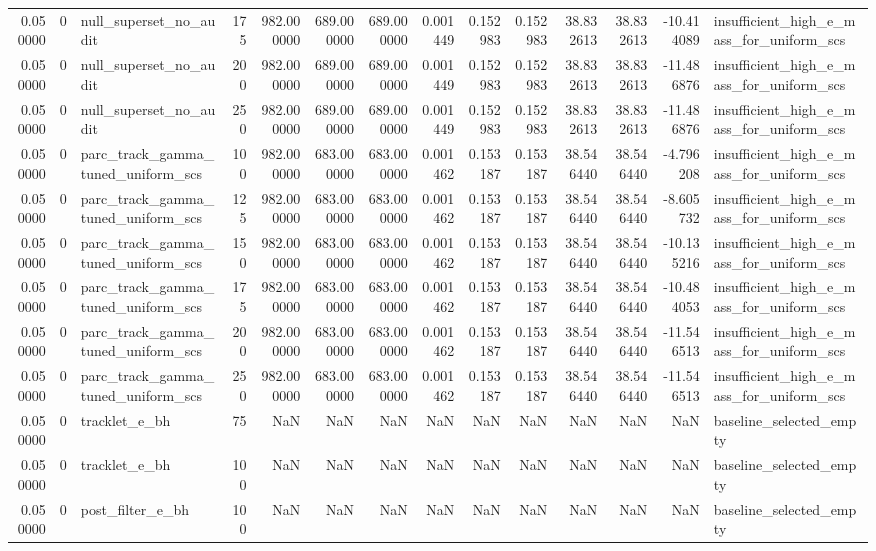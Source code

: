 \begin{tabular}{rrlrrrrrrrrrrl}
0.050000 & 0 & null_superset_no_audit & 175 & 982.000000 & 689.000000 & 689.000000 & 0.001449 & 0.152983 & 0.152983 & 38.832613 & 38.832613 & -10.414089 & insufficient_high_e_mass_for_uniform_scs \\
0.050000 & 0 & null_superset_no_audit & 200 & 982.000000 & 689.000000 & 689.000000 & 0.001449 & 0.152983 & 0.152983 & 38.832613 & 38.832613 & -11.486876 & insufficient_high_e_mass_for_uniform_scs \\
0.050000 & 0 & null_superset_no_audit & 250 & 982.000000 & 689.000000 & 689.000000 & 0.001449 & 0.152983 & 0.152983 & 38.832613 & 38.832613 & -11.486876 & insufficient_high_e_mass_for_uniform_scs \\
0.050000 & 0 & parc_track_gamma_tuned_uniform_scs & 100 & 982.000000 & 683.000000 & 683.000000 & 0.001462 & 0.153187 & 0.153187 & 38.546440 & 38.546440 & -4.796208 & insufficient_high_e_mass_for_uniform_scs \\
0.050000 & 0 & parc_track_gamma_tuned_uniform_scs & 125 & 982.000000 & 683.000000 & 683.000000 & 0.001462 & 0.153187 & 0.153187 & 38.546440 & 38.546440 & -8.605732 & insufficient_high_e_mass_for_uniform_scs \\
0.050000 & 0 & parc_track_gamma_tuned_uniform_scs & 150 & 982.000000 & 683.000000 & 683.000000 & 0.001462 & 0.153187 & 0.153187 & 38.546440 & 38.546440 & -10.135216 & insufficient_high_e_mass_for_uniform_scs \\
0.050000 & 0 & parc_track_gamma_tuned_uniform_scs & 175 & 982.000000 & 683.000000 & 683.000000 & 0.001462 & 0.153187 & 0.153187 & 38.546440 & 38.546440 & -10.484053 & insufficient_high_e_mass_for_uniform_scs \\
0.050000 & 0 & parc_track_gamma_tuned_uniform_scs & 200 & 982.000000 & 683.000000 & 683.000000 & 0.001462 & 0.153187 & 0.153187 & 38.546440 & 38.546440 & -11.546513 & insufficient_high_e_mass_for_uniform_scs \\
0.050000 & 0 & parc_track_gamma_tuned_uniform_scs & 250 & 982.000000 & 683.000000 & 683.000000 & 0.001462 & 0.153187 & 0.153187 & 38.546440 & 38.546440 & -11.546513 & insufficient_high_e_mass_for_uniform_scs \\
0.050000 & 0 & tracklet_e_bh & 75 & NaN & NaN & NaN & NaN & NaN & NaN & NaN & NaN & NaN & baseline_selected_empty \\
0.050000 & 0 & tracklet_e_bh & 100 & NaN & NaN & NaN & NaN & NaN & NaN & NaN & NaN & NaN & baseline_selected_empty \\
0.050000 & 0 & post_filter_e_bh & 100 & NaN & NaN & NaN & NaN & NaN & NaN & NaN & NaN & NaN & baseline_selected_empty \\

\end{tabular}
